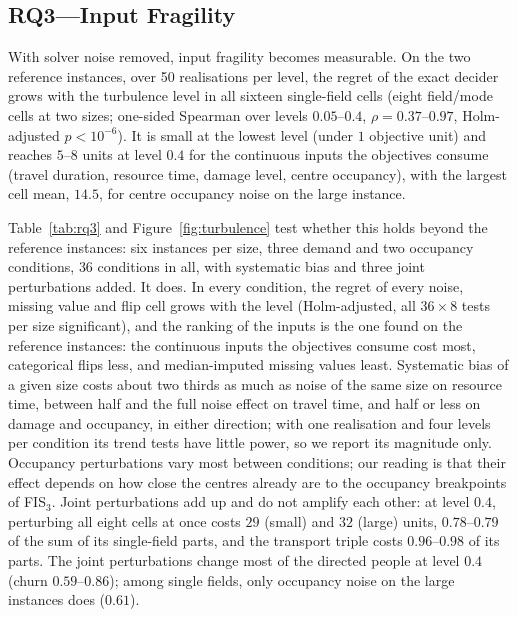 \documentclass[systems,article,accept,moreauthors,pdftex]{Definitions/mdpi}
\begin{document}
\subsection{RQ3---Input Fragility}\label{sec:rq3}
With solver noise removed, input fragility becomes measurable. On the two reference instances,
over 50 realisations per level, the regret of the exact decider grows with the turbulence level
in all sixteen single-field cells (eight field/mode cells at two sizes; one-sided Spearman over
levels $0.05$--$0.4$, $\rho = 0.37$--$0.97$, Holm-adjusted $p < 10^{-6}$). It is small at the
lowest level (under $1$ objective unit) and reaches $5$--$8$ units at level $0.4$ for the
continuous inputs the objectives consume (travel duration, resource time, damage level, centre
occupancy), with the largest cell mean, $14.5$, for centre occupancy noise on the \linebreak  large instance.

Table~\ref{tab:rq3} and Figure~\ref{fig:turbulence} test whether this holds beyond the reference
instances: six instances per size, three demand and two occupancy conditions, $36$ conditions in
all, with systematic bias and three joint perturbations added. It does. In every condition, the
regret of every noise, missing value and flip cell grows with the level (Holm-adjusted, all
$36 \times 8$ tests per size significant), and the ranking of the inputs is the one found on the
reference instances: the continuous inputs the objectives consume cost most, categorical flips
less, and median-imputed missing values least. Systematic bias of a given size costs about two
thirds as much as noise of the same size on resource time, between half and the full noise effect on
travel time, and half or less on damage and occupancy, in either direction; with one realisation and four levels per condition its
trend tests have little power, so we report its magnitude only. Occupancy perturbations vary most
between conditions; our reading is that their effect depends on how close the centres already are
to the occupancy breakpoints of FIS$_3$. Joint perturbations add up and do not amplify each other: at level $0.4$, perturbing all
eight cells at once costs $29$ (small) and $32$ (large) units, $0.78$--$0.79$ of the sum of its
single-field parts, and the transport triple costs $0.96$--$0.98$ of its parts. The joint
perturbations change most of the directed people at level $0.4$ (churn $0.59$--$0.86$); among
single fields, only occupancy noise on the large instances does ($0.61$).
\end{document}
